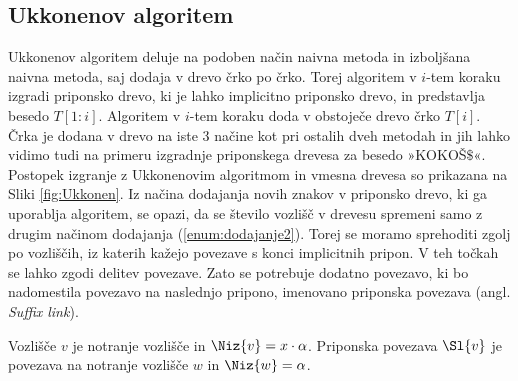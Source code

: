 \subsection{Ukkonenov algoritem}
Ukkonenov algoritem deluje na podoben način naivna metoda in izboljšana naivna metoda, saj dodaja v drevo črko po črko. Torej algoritem v $i$-tem koraku izgradi priponsko drevo, ki je lahko implicitno priponsko drevo, in predstavlja besedo $T[1:i]$. Algoritem v $i$-tem koraku doda v obstoječe drevo črko $T[i]$. Črka je dodana v drevo na iste 3 načine kot pri ostalih dveh metodah in jih lahko vidimo tudi na primeru izgradnje priponskega drevesa za besedo »KOKOŠ$\$$«. Postopek izgranje z Ukkonenovim algoritmom in vmesna drevesa so prikazana na Sliki \ref{fig:Ukkonen}. Iz načina dodajanja novih znakov v priponsko drevo, ki ga uporablja algoritem, se opazi, da se število vozlišč v drevesu spremeni samo z drugim načinom dodajanja (\ref{enum:dodajanje2}). Torej se moramo sprehoditi zgolj po vozliščih, iz katerih kažejo povezave s konci implicitnih pripon. V teh točkah se lahko zgodi delitev povezave. Zato se potrebuje dodatno povezavo, ki bo nadomestila povezavo na naslednjo pripono, imenovano priponska povezava (angl. \textit{Suffix link}). 

\begin{defi}\label{def:sl}
    Vozlišče $v$ je notranje vozlišče in $\Niz{v}=x\cdot\alpha$. Priponska povezava $\Sl{v}$ je povezava na notranje vozlišče $w$ in $\Niz{w}=\alpha$.
\end{defi}

